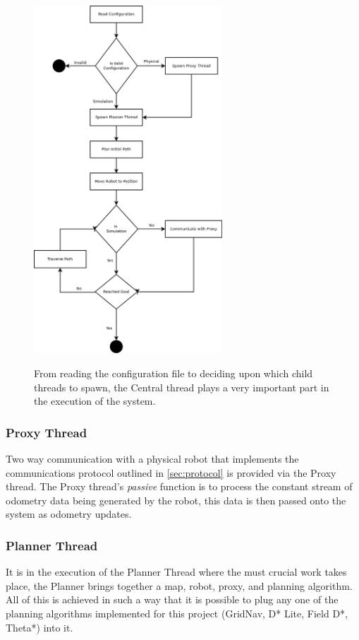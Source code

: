 \begin{figure}[htbp]

\center \includegraphics[width=200pt]{illustrations/thread_flow.png}\\
\caption{From reading the configuration file to deciding upon which child threads to spawn, the Central thread plays a very important part in the execution of the system.} 
\label{central thread}

\end{figure}

\subsubsection*{Proxy Thread}
\noindent
Two way communication with a physical robot that implements the communications protocol outlined in \ref{sec:protocol} is provided via the Proxy thread. The Proxy thread's \textit{passive} function is to process the constant stream of odometry data being generated by the robot, this data is then passed onto the system as odometry updates. 

\subsubsection*{Planner Thread}
\noindent
It is in the execution of the Planner Thread where the must crucial work takes place, the Planner brings together a map, robot, proxy, and planning algorithm. All of this is achieved in such a way that it is possible to plug any one of the planning algorithms implemented for this project (GridNav, D* Lite, Field D*, Theta*) into it. \\

